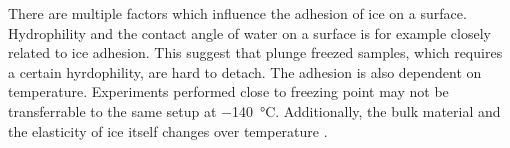 There are multiple factors which influence the adhesion of ice on a surface. Hydrophility and the contact angle of water on a surface is for example closely related to ice adhesion. This suggest that plunge freezed samples, which requires a certain hyrdophility, are hard to detach. The adhesion is also dependent on temperature. Experiments performed close to freezing point may not be transferrable to the same setup at \SI{-140}{\degreeCelsius}. Additionally, the bulk material and the elasticity of ice itself changes over temperature \cite{Makkonen.2012}.
